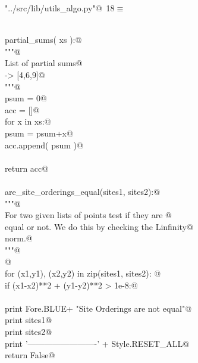 \documentclass[11.5pt]{report}
\begin{document}
\begin{flushleft} \small\label{scrap10}\raggedright\small
{} \verb@"../src/lib/utils_algo.py"@\nobreak\ {\footnotesize {18}}$\equiv$
\vspace{-1ex}
\begin{list}{}{} \item
\mbox{}\verb@@\\
\mbox{}\verb@def partial_sums( xs ):@\\
\mbox{}\verb@    """@\\
\mbox{}\verb@    List of partial sums@\\
\mbox{}\verb@    [4,2,3] -> [4,6,9]@\\
\mbox{}\verb@    """@\\
\mbox{}\verb@    psum = 0@\\
\mbox{}\verb@    acc = []@\\
\mbox{}\verb@    for x in xs:@\\
\mbox{}\verb@        psum = psum+x@\\
\mbox{}\verb@        acc.append( psum )@\\
\mbox{}\verb@@\\
\mbox{}\verb@    return acc@\\
\mbox{}\verb@@\\
\mbox{}\verb@def are_site_orderings_equal(sites1, sites2):@\\
\mbox{}\verb@    """@\\
\mbox{}\verb@    For two given lists of points test if they are @\\
\mbox{}\verb@    equal or not. We do this by checking the Linfinity@\\
\mbox{}\verb@    norm.@\\
\mbox{}\verb@    """@\\
\mbox{}\verb@    @\\
\mbox{}\verb@    for (x1,y1), (x2,y2) in zip(sites1, sites2): @\\
\mbox{}\verb@        if (x1-x2)**2 + (y1-y2)**2 > 1e-8:@\\
\mbox{}\verb@@\\
\mbox{}\verb@            print Fore.BLUE+ "Site Orderings are not equal"@\\
\mbox{}\verb@            print sites1@\\
\mbox{}\verb@            print sites2@\\
\mbox{}\verb@            print '-------------------------' + Style.RESET_ALL@\\
\mbox{}\verb@            return False@\\

\end{list}
\end{flushleft}
\end{document}
